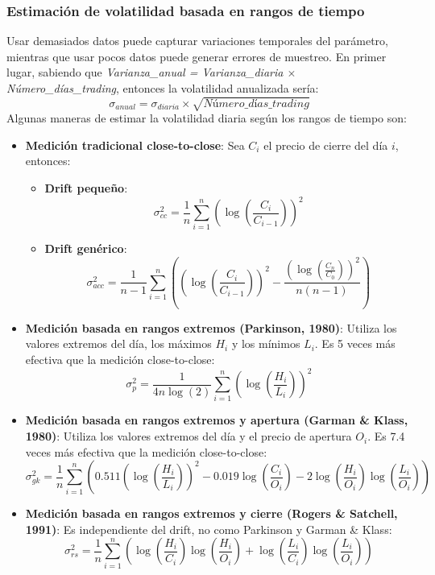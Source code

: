 \subsubsection{Estimación de volatilidad basada en rangos de tiempo}
Usar demasiados datos puede capturar variaciones temporales del parámetro, mientras que usar pocos datos puede generar errores de muestreo. En primer lugar, sabiendo que \textit{Varianza\_anual = Varianza\_diaria $\times$ Número\_días\_trading}, entonces la volatilidad anualizada sería:
\[
\boxed{\sigma_{anual} = \sigma_{diaria} \times \sqrt{\textit{Número\_días\_trading}}}
\]
Algunas maneras de estimar la volatilidad diaria según los rangos de tiempo son:
\begin{itemize}
    \item \textbf{Medición tradicional close-to-close}: Sea $C_i$ el precio de cierre del día $i$, entonces:
    \begin{itemize}
        \item \textbf{Drift pequeño}:
        \[
        \boxed{\sigma^2_{cc} = \frac{1}{n} \sum_{i=1}^{n} \left( \log \left( \frac{C_i}{C_{i-1}} \right) \right)^2}
        \]
        \item \textbf{Drift genérico}:
        \[
        \boxed{\sigma^2_{acc} = \frac{1}{n-1} \sum_{i=1}^{n} \left( \left( \log \left( \frac{C_i}{C_{i-1}} \right) \right)^2 - \frac{\left( \log \left( \frac{C_n}{C_0} \right) \right)^2}{n(n-1)} \right)}
        \]
    \end{itemize}
    \item \textbf{Medición basada en rangos extremos (Parkinson, 1980)}: Utiliza los valores extremos del día, los máximos $H_i$ y los mínimos $L_i$. Es 5 veces más efectiva que la medición close-to-close:
    \[
    \boxed{\sigma_p^2 = \frac{1}{4n \log(2)} \sum_{i=1}^{n} \left( \log \left( \frac{H_i}{L_i} \right) \right)^2}
    \]

    \item \textbf{Medición basada en rangos extremos y apertura (Garman \& Klass, 1980)}: Utiliza los valores extremos del día y el precio de apertura $O_i$. Es 7.4 veces más efectiva que la medición close-to-close:
    \[
    \boxed{\sigma_{gk}^2 = \frac{1}{n} \sum_{i=1}^{n} \left( 0.511 \left( \log \left( \frac{H_i}{L_i} \right) \right)^2 - 0.019 \log \left( \frac{C_i}{O_i} \right) - 2 \log \left( \frac{H_i}{O_i} \right) \log \left( \frac{L_i}{O_i} \right) \right)}
    \]

    \item \textbf{Medición basada en rangos extremos y cierre (Rogers \& Satchell, 1991)}: Es independiente del drift, no como Parkinson y Garman \& Klass:
    \[
    \boxed{\sigma_{rs}^2 = \frac{1}{n} \sum_{i=1}^{n} \left( \log \left( \frac{H_i}{C_i} \right) \log \left( \frac{H_i}{O_i} \right) + \log \left( \frac{L_i}{C_i} \right) \log \left( \frac{L_i}{O_i} \right) \right)}
    \]
\end{itemize}





